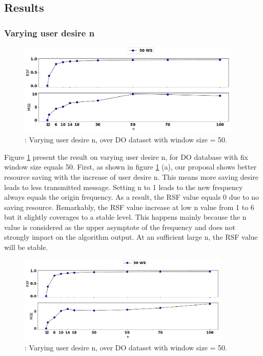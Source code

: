 \subsection{Results}

\subsubsection{Varying user desire n}

\begin{figure}[h]
	\centering
	\includegraphics[width=0.95\textwidth]{Part3/Chapter8/figures/result_various_n.pdf}
	\caption{ : Varying user desire n, over DO dataset with window size = 50.}
	\label{fig: various_n}
\end{figure}

Figure \ref{fig: various_n} present the result on varying user desire n, for DO database with fix window size equals 50. First, as shown in figure \ref{fig: various_n} (a), our proposal shows better resource saving with the increase of user desire n. This means more saving desire leads to less transmitted message. Setting n to 1 leads to the new frequency always equals the origin frequency. As a result, the RSF value equals 0 due to no saving resource. 
Remarkably, the RSF value increase at low n value from 1 to 6 but it slightly coverages to a stable level. This happens mainly because the n value is considered as the upper asymptote of the frequency and does not strongly impact on the algorithm output. At an sufficient large n, the RSF value will be stable. \\%

\begin{figure}[h]
	\centering
	\includegraphics[width=0.9\textwidth]{Part3/Chapter8/figures/result_various_n_iot.pdf}
	\caption{ : Varying user desire n, over DO dataset with window size = 50.}
	\label{fig: various_n_iot}
\end{figure}

